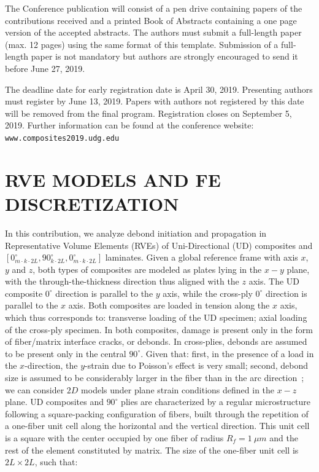 \documentclass[12pt,a4paper]{article}
\begin{document}
The Conference publication will consist of a pen drive containing papers of the contributions received and a printed Book of Abstracts containing a one page version of the accepted abstracts. The authors must submit a full-length paper (max. 12 pages) using the same format of this template. Submission of a full-length paper is not mandatory but authors are strongly encouraged to send it before June 27, 2019.

The deadline date for early registration date is April 30, 2019. Presenting authors must register by June 13, 2019. Papers with authors not registered by this date will be removed from the final program.
Registration closes on September 5, 2019. Further information can be found at the conference website: \texttt{www.composites2019.udg.edu}

\section{RVE MODELS AND FE DISCRETIZATION}

In this contribution, we analyze debond initiation and propagation in Representative Volume Elements (RVEs) of Uni-Directional (UD) composites and $\left[0_{m\cdot k\cdot2L}^{\circ},90_{k\cdot2L}^{\circ},0_{m\cdot k\cdot2L}^{\circ}\right]$ laminates. Given a global reference frame with axis $x$, $y$ and $z$, both types of composites are modeled as plates lying in the $x-y$ plane, with the through-the-thickness direction thus aligned with the $z$ axis. The UD composite $0^{\circ}$ direction is parallel to the $y$ axis, while the cross-ply $0^{\circ}$ direction is parallel to the $x$ axis. Both composites are loaded in tension along the $x$ axis, which thus corresponds to: transverse loading of the UD specimen; axial loading of the cross-ply specimen. In both composites, damage is present only in the form of fiber/matrix interface cracks, or debonds. In cross-plies, debonds are assumed to be present only in the central ${90^{\circ}}$. Given that: first, in the presence of a load in the $x$-direction, the $y$-strain due to Poisson's effect is very small; second, debond size is assumed to be considerably larger in the fiber than in the arc direction~\cite{Zhang1997}; we can consider $2D$ models under plane strain conditions defined in the $x-z$ plane. UD composites and $90^{\circ}$ plies are characterized by a regular microstructure following a square-packing configuration of fibers, built through the repetition of a one-fiber unit cell along the horizontal and the vertical direction. This unit cell is a square with the center occupied by one fiber of radius $R_{f}=1\ \mu m$ and the rest of the element constituted by matrix. The size of the one-fiber unit cell is $2L\times 2L$, such that:
\end{document}
